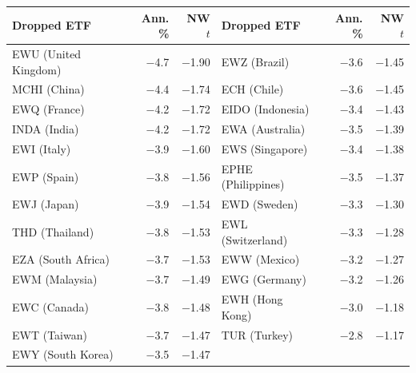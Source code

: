 \begin{tabular}{lrr@{\hspace{2em}}lrr}
\toprule
Dropped ETF & Ann. \% & NW $t$ & Dropped ETF & Ann. \% & NW $t$ \\
\midrule
EWU (United Kingdom) & $-$4.7 & $-$1.90 & EWZ (Brazil) & $-$3.6 & $-$1.45 \\
MCHI (China) & $-$4.4 & $-$1.74 & ECH (Chile) & $-$3.6 & $-$1.45 \\
EWQ (France) & $-$4.2 & $-$1.72 & EIDO (Indonesia) & $-$3.4 & $-$1.43 \\
INDA (India) & $-$4.2 & $-$1.72 & EWA (Australia) & $-$3.5 & $-$1.39 \\
EWI (Italy) & $-$3.9 & $-$1.60 & EWS (Singapore) & $-$3.4 & $-$1.38 \\
EWP (Spain) & $-$3.8 & $-$1.56 & EPHE (Philippines) & $-$3.5 & $-$1.37 \\
EWJ (Japan) & $-$3.9 & $-$1.54 & EWD (Sweden) & $-$3.3 & $-$1.30 \\
THD (Thailand) & $-$3.8 & $-$1.53 & EWL (Switzerland) & $-$3.3 & $-$1.28 \\
EZA (South Africa) & $-$3.7 & $-$1.53 & EWW (Mexico) & $-$3.2 & $-$1.27 \\
EWM (Malaysia) & $-$3.7 & $-$1.49 & EWG (Germany) & $-$3.2 & $-$1.26 \\
EWC (Canada) & $-$3.8 & $-$1.48 & EWH (Hong Kong) & $-$3.0 & $-$1.18 \\
EWT (Taiwan) & $-$3.7 & $-$1.47 & TUR (Turkey) & $-$2.8 & $-$1.17 \\
EWY (South Korea) & $-$3.5 & $-$1.47 &  & & \\
\bottomrule
\end{tabular}